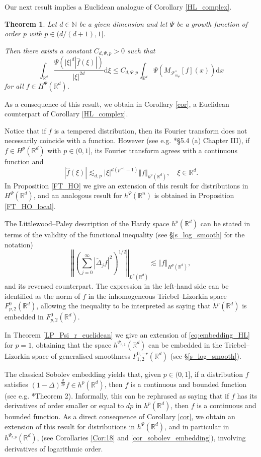 \documentclass[a4paper, leqno, 10pt]{amsart}
\numberwithin{equation}{section}
\newtheorem{theo}[thm]{Theorem}
\newcommand{\dd}{\mathrm{d}}
\newcommand{\R}{\mathbb{R}}
\newcommand{\norm}[1]{\left\Vert#1\right\Vert}
\newcommand{\brkt}[1]{\left(#1\right)}
\newcommand{\abs}[1]{\left|#1\right|}
\newcommand{\N}{\mathbb{N}}
\begin{document}
Our next result implies a Euclidean analogue of Corollary \ref{HL_complex}.
 
\begin{theo}\label{eucl} Let $d \in \N$ be a given dimension and let $\Psi$ be a growth function of order $p$ with $p \in ( d/ (d+1), 1]$. 

Then there exists a constant $C_{d, \Psi, p} > 0$ such that 
\[
\int_{\R^d}   \frac{\Psi \brkt{ \abs{ \xi}^d \abs{ \widehat{f} (\xi) } } } { \abs{ \xi }^{2d} }\dd\xi \leq C_{d, \Psi,p}   \int_{\R^d} \Psi \left( M_{ \mathcal{F}_{m_{\Psi}}^*} [f] (x) \right)  \dd x
\] 
for all $f \in H^{\Psi} (\R^d)$.
\end{theo}

As a consequence of this result, we obtain in Corollary \ref{cor}, a Euclidean counterpart of Corollary \ref{HL_complex}.

Notice that if $f$ is a tempered distribution,  then its Fourier transform  does not necessarily coincide with a function. However (see e.g. \cite{Big_Stein}*{\S 5.4 (a) Chapter III}), if $f\in H^p(\R^d)$ with $p \in (0,1]$, its Fourier transform agrees with a continuous function and 
\[
	\abs{\widehat{f} (\xi)} \lesssim_{d,p} \abs{\xi}^{d (p^{-1}-1)} \norm{f}_{h^p (\R^d)}, \quad \xi \in \R^d. 
\]
In Proposition \ref{FT_HO} we give an extension of this result for distributions in $H^\Psi(\R^d)$, and an analogous result for $h^\Psi(\R^n)$ is obtained in Proposition \ref{FT_HO_local}.

The Littlewood--Paley description of the Hardy space $h^p(\R^d)$ can be stated in terms of the validity of the functional inequality (see \S \ref{s_log_smooth} for the notation) 
\begin{equation}\label{eq:embedding_HL}
\norm{\left(\sum_{j=0}^\infty\abs{\widetilde{\Delta}_jf}^2\right)^{1/2}}_{L^p(\R^d)}\lesssim \norm{f}_{H^p (\R^d)},
\end{equation}
and its reversed counterpart. The expression in the left-hand side can be identified as the norm of $f$ in the inhomogeneous Triebel--Lizorkin space $F^{0}_{p,2}(\R^d)$, allowing the inequality to be interpreted as saying that $h^p(\R^d)$ is embedded in $F^{0}_{p,2}(\R^d)$.

In Theorem \ref{LP_Psi_r_euclidean} we give an extension of \eqref{eq:embedding_HL} for $p=1$, obtaining that the space $h^{\Psi_{r,1}}(\R^d)$ can be embedded in the Triebel--Lizorkin space of generalised smoothness $F^{0,-r}_{1,2}(\R^d)$ (see \S \ref{s_log_smooth}).

The classical Sobolev embedding yields that, given $p \in (0,1]$, if a distribution $f$ satisfies $(1-\Delta)^{\frac{d}{2p}}f\in h^p(\R^d)$, then $f$ is a continuous and bounded function (see e.g. \cite{Franke}*{Theorem 2}). Informally, this can be rephrased as saying that if $f$ has its derivatives of order smaller or equal to $dp$ in $h^p(\R^d)$, then $f$ is a continuous and bounded function.  As a direct consequence of Corollary \ref{cor}, we obtain an extension of this  result for distributions in $h^{\Psi}(\R^d)$, and in particular in $h^{\Psi_{r,p}}(\R^d)$, (see Corollaries  \ref{Cor:18} and \ref{cor_sobolev_embedding}), involving derivatives of logarithmic order. 
\end{document}

